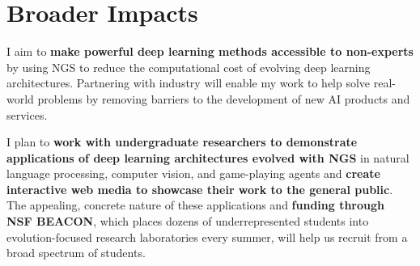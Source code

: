 \section{Broader Impacts}

I aim to \textbf{make powerful deep learning methods accessible to non-experts} by using NGS to reduce the computational cost of evolving deep learning architectures.
Partnering with industry will enable my work to help solve real-world problems by removing barriers to the development of new AI products and services.

I plan to \textbf{work with undergraduate researchers to demonstrate applications of deep learning architectures evolved with NGS} in natural language processing, computer vision, and game-playing agents and \textbf{create interactive web media to showcase their work to the general public}.
The appealing, concrete nature of these applications and \textbf{funding through NSF BEACON}, which places dozens of underrepresented students into evolution-focused research laboratories every summer, will help us recruit from a broad spectrum of students.
